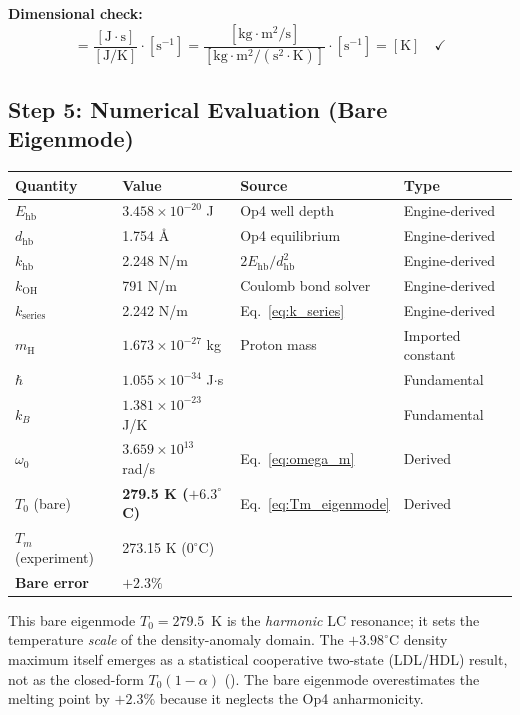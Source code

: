 \noindent\textbf{Dimensional check:}
\begin{equation}
  [T_m] = \frac{[\text{J}\cdot\text{s}]}{[\text{J/K}]} \cdot [\text{s}^{-1}]
  = \frac{[\text{kg}\cdot\text{m}^2/\text{s}]}{[\text{kg}\cdot\text{m}^2/(\text{s}^2\cdot\text{K})]}
  \cdot [\text{s}^{-1}] = [\text{K}] \quad\checkmark
\end{equation}

\subsection{Step 5: Numerical Evaluation (Bare Eigenmode)}

\begin{center}
\small
\renewcommand{\arraystretch}{1.2}
\begin{tabularx}{\textwidth}{@{}lllX@{}}
\toprule
\textbf{Quantity} & \textbf{Value} & \textbf{Source} & \textbf{Type} \\
\midrule
$E_\text{hb}$ & $3.458 \times 10^{-20}$ J & Op4 well depth & Engine-derived \\
$d_\text{hb}$ & 1.754 \AA & Op4 equilibrium & Engine-derived \\
$k_\text{hb}$ & 2.248 N/m & $2E_\text{hb}/d_\text{hb}^2$ & Engine-derived \\
$k_\text{OH}$ & 791 N/m & Coulomb bond solver & Engine-derived \\
$k_\text{series}$ & 2.242 N/m & Eq.~\eqref{eq:k_series} & Engine-derived \\
$m_\text{H}$ & $1.673 \times 10^{-27}$ kg & Proton mass & Imported constant \\
$\hbar$ & $1.055 \times 10^{-34}$ J$\cdot$s & & Fundamental \\
$k_B$ & $1.381 \times 10^{-23}$ J/K & & Fundamental \\
\midrule
$\omega_0$ & $3.659 \times 10^{13}$ rad/s & Eq.~\eqref{eq:omega_m} & Derived \\
$T_0$ (bare) & \textbf{279.5 K ($+6.3^{\circ}$C)} & Eq.~\eqref{eq:Tm_eigenmode} & Derived \\
$T_m$ (experiment) & 273.15 K ($0^{\circ}$C) & & \\
\textbf{Bare error} & $\mathbf{+2.3\%}$ & & \\
\bottomrule
\end{tabularx}
\end{center}

This bare eigenmode $T_0 = 279.5$~K is the \emph{harmonic} LC resonance; it sets the temperature \emph{scale} of the density-anomaly domain. The $+3.98^{\circ}$C density maximum itself emerges as a statistical cooperative two-state (LDL/HDL) result, not as the closed-form $T_0(1-\alpha)$ (). The bare eigenmode overestimates the melting point by $+2.3\%$ because it neglects the Op4 anharmonicity.

